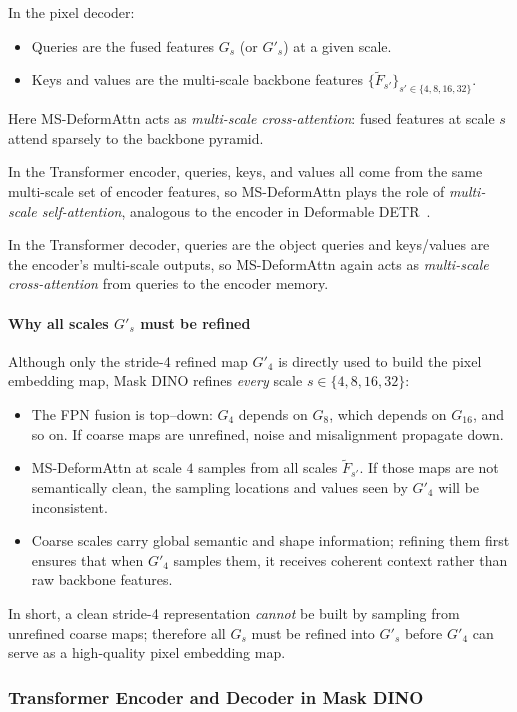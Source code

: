 \begin{enrichment}
\begin{enrichment}
		In the pixel decoder:
		\begin{itemize}
			\item Queries are the fused features $G_s$ (or $G'_s$) at a given scale.
			\item Keys and values are the multi-scale backbone features $\{\tilde F_{s'}\}_{s' \in \{4,8,16,32\}}$.
		\end{itemize}
		Here MS-DeformAttn acts as \emph{multi-scale cross-attention}: fused features at scale $s$ attend sparsely to the backbone pyramid.
		
		In the Transformer encoder, queries, keys, and values all come from the same multi-scale set of encoder features, so MS-DeformAttn plays the role of \emph{multi-scale self-attention}, analogous to the encoder in Deformable DETR~\cite{zhu2021_deformabledetr}.
		
		In the Transformer decoder, queries are the object queries and keys/values are the encoder’s multi-scale outputs, so MS-DeformAttn again acts as \emph{multi-scale cross-attention} from queries to the encoder memory.
		
		\paragraph{Why all scales $G'_s$ must be refined}
		Although only the stride-4 refined map $G'_4$ is directly used to build the pixel embedding map, Mask DINO refines \emph{every} scale $s\in\{4,8,16,32\}$:
		\begin{itemize}
			\item The FPN fusion is top--down: $G_4$ depends on $G_8$, which depends on $G_{16}$, and so on. If coarse maps are unrefined, noise and misalignment propagate down.
			\item MS-DeformAttn at scale $4$ samples from all scales $\tilde F_{s'}$. If those maps are not semantically clean, the sampling locations and values seen by $G'_4$ will be inconsistent.
			\item Coarse scales carry global semantic and shape information; refining them first ensures that when $G'_4$ samples them, it receives coherent context rather than raw backbone features.
		\end{itemize}
		In short, a clean stride-4 representation \emph{cannot} be built by sampling from unrefined coarse maps; therefore all $G_s$ must be refined into $G'_s$ before $G'_4$ can serve as a high-quality pixel embedding map.
		
		\subsubsection{Transformer Encoder and Decoder in Mask DINO}
		

\end{enrichment}
\end{enrichment}
